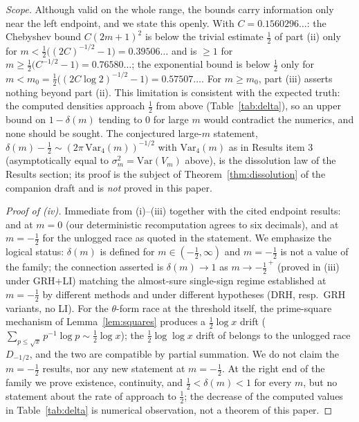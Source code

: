 \emph{Scope.} Although valid on the whole range, the bounds carry
information only near the left endpoint, and we state this openly.
With $C=0.1560296\ldots$: the Chebyshev bound $C(2m+1)^2$ is below the
trivial estimate $\tfrac12$ of part (ii) only for
$m<\tfrac12\bigl((2C)^{-1/2}-1\bigr)=0.39506\ldots$ and is $\ge1$ for
$m\ge\tfrac12\bigl(C^{-1/2}-1\bigr)=0.76580\ldots$; the exponential
bound is below $\tfrac12$ only for
$m<m_0=\tfrac12\bigl((2C\log2)^{-1/2}-1\bigr)=0.57507\ldots$. For
$m\ge m_0$, part (iii) asserts nothing beyond part (ii). This
limitation is consistent with the expected truth: the computed
densities approach $\tfrac12$ from above (Table~\ref{tab:delta}), so an
upper bound on $1-\delta(m)$ tending to $0$ for large $m$ would
contradict the numerics, and none should be sought. The conjectured
large-$m$ statement,
$\delta(m)-\tfrac12\sim(2\pi\,\mathrm{Var}_4(m))^{-1/2}$ with
$\mathrm{Var}_4(m)$ as in Results item 3 (asymptotically equal to
$\sigma_m^2=\mathrm{Var}(V_m)$ above), is the
dissolution law of the Results section; its proof is the subject of
Theorem~\ref{thm:dissolution} of the companion draft and is \emph{not}
proved in this paper.



\begin{proof}[Proof of (iv)]
Immediate from (i)--(iii) together with the cited endpoint results:
\cite{RS94} and \cite{FM13} at $m=0$ (our deterministic recomputation
agrees to six decimals), and \cite{AK23,Sheth24,Hay25} at $m=-\tfrac12$
for the unlogged race as quoted in the statement. We emphasize the
logical status: $\delta(m)$ is defined for $m\in(-\tfrac12,\infty)$ and
$m=-\tfrac12$ is not a value of the family; the connection asserted is
$\delta(m)\to1$ as $m\to-\tfrac12^{\,+}$ (proved in (iii) under
GRH+LI) matching the almost-sure single-sign regime established at
$m=-\tfrac12$ by different methods and under different hypotheses
(DRH, resp.\ GRH variants, no LI). For the $\theta$-form race at the
threshold itself, the prime-square mechanism of
Lemma~\ref{lem:squares} produces a $\tfrac12\log x$ drift
($\sum_{p\le\sqrt x}p^{-1}\log p\sim\tfrac12\log x$); the
$\tfrac12\log\log x$ drift of \cite{AK23,Sheth24} belongs to the
unlogged race $D_{-1/2}$, and the two are compatible by partial
summation. We do not claim the $m=-\tfrac12$ results, nor any new
statement at $m=-\tfrac12$. At the right end of the family we prove
existence, continuity, and $\tfrac12<\delta(m)<1$ for every $m$, but
no statement about the rate of approach to $\tfrac12$; the decrease of
the computed values in Table~\ref{tab:delta} is numerical observation,
not a theorem of this paper.
\end{proof}


